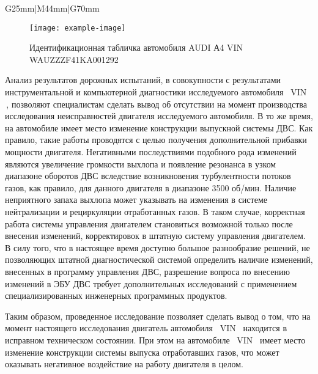 \begin{longtable}{G{25mm}|M{44mm}|G{70mm}}
\begin{figure}[H]
	\centering
	\texttt{[image: example-image]}
	\caption{Идентификационная табличка автомобиля  AUDI А4 VIN WAUZZZF41KA001292}
	\label{fig:4}
\end{figure}

\vspace{4mm}

Анализ результатов дорожных испытаний, в совокупности с результатами  инструментальной и компьютерной диагностики исследуемого автомобиля  \, VIN \vin\,, позволяют специалистам  сделать вывод об отсутствии на момент производства исследования неисправностей двигателя исследуемого автомобиля. В то же время, на автомобиле имеет место изменение конструкции выпускной системы ДВС. Как правило, такие работы проводятся с целью получения дополнительной прибавки мощности двигателя.  Негативными последствиями подобного рода изменений  являются увеличение громкости выхлопа и появление резонанса в узком диапазоне оборотов ДВС вследствие возникновения турбулентности потоков газов, как правило, для данного двигателя в диапазоне 3500 об/мин. Наличие неприятного запаха выхлопа может указывать на изменения в системе нейтрализации и рециркуляции  отработанных газов. В таком случае, корректная работа системы управления двигателем становиться возможной только после внесения изменений, корректировок в штатную систему управления двигателем. В силу того, что в настоящее время доступно большое разнообразие  решений, не позволяющих штатной диагностической системой определить наличие изменений, внесенных в программу управления ДВС, разрешение вопроса по внесению изменений в ЭБУ ДВС требует дополнительных исследований с применением специализированных инженерных программных  продуктов.  

Таким образом, проведенное исследование позволяет сделать вывод о том, что на момент настоящего исследования двигатель автомобиля  \, VIN \vin\, находится в исправном техническом состоянии. При этом  на автомобиле  \, VIN \vin\  имеет место изменение конструкции системы выпуска отработавших газов, что может оказывать негативное воздействие на работу двигателя в целом.

%



\end{longtable}
